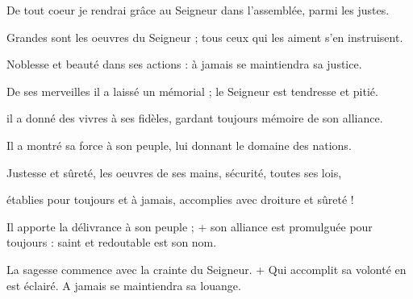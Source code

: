 \item De tout coeur je rendrai grâce au Seigneur dans l'assemblée, parmi les justes.

\item Grandes sont les oeuvres du Seigneur ; tous ceux qui les aiment s'en instruisent.

\item Noblesse et beauté dans ses actions : à jamais se maintiendra sa justice.

\item De ses merveilles il a laissé un mémorial ; le Seigneur est tendresse et pitié.

\item il a donné des vivres à ses fidèles, gardant toujours mémoire de son alliance.

\item Il a montré sa force à son peuple, lui donnant le domaine des nations.

\item Justesse et sûreté, les oeuvres de ses mains, sécurité, toutes ses lois,

\item établies pour toujours et à jamais, accomplies avec droiture et sûreté !

\item Il apporte la délivrance à son peuple ; + son alliance est promulguée pour toujours : saint et redoutable est son nom.

\item La sagesse commence avec la crainte du Seigneur. + Qui accomplit sa volonté en est éclairé. A jamais se maintiendra sa louange.

